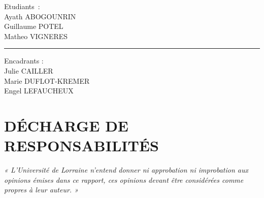 \documentclass[11pt]{article}
\begin{document}
\begin{titlepage}
    \begin{minipage}[t]{0.45\textwidth}
        \begin{flushleft}
            \small Etudiants~: \\
            \hspace*{1.5em} Ayath ABOGOUNRIN \\
            \hspace*{1.5em} Guillaume POTEL \\
            \hspace*{1.5em} Matheo VIGNERES
        \end{flushleft}
    \end{minipage}%
    \begin{minipage}[t]{0.1\textwidth}
        \vspace*{0.5em} %
        \centering
        \rule{1pt}{\baselineskip+ 0.5em} %
    \end{minipage}%
    \begin{minipage}[t]{0.45\textwidth}
        \begin{flushright}
            \small Encadrants : \\
            \hspace*{0pt}\llap{\hspace*{1.5em}} Julie CAILLER \\
            \hspace*{0pt}\llap{\hspace*{1.5em}} Marie DUFLOT-KREMER \\
            \hspace*{0pt}\llap{\hspace*{1.5em}} Engel LEFAUCHEUX
        \end{flushright}
    \end{minipage}
\end{titlepage}
\thispagestyle{empty}

\newpage
\null

\newpage
{}  %
\section*{DÉCHARGE DE RESPONSABILITÉS}
\vspace*{\fill}
\textit{« L’Université de Lorraine n’entend donner ni approbation ni improbation aux opinions émises dans ce
rapport, ces opinions devant être considérées comme propres à leur auteur. »}
\vspace*{\fill}
\end{document}
